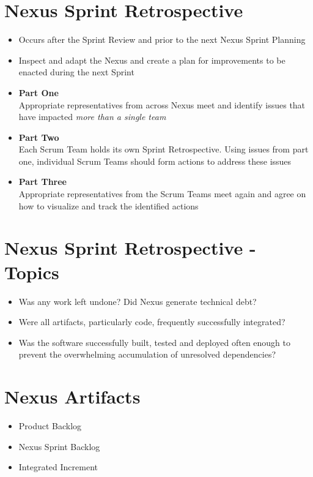 \documentclass[a4paper,11pt,twocolumn]{article}
\begin{document}
\section*{Nexus Sprint Retrospective}
\begin{itemize}
	\item Occurs after the Sprint Review and prior to the next Nexus Sprint Planning
	\item Inspect and adapt the Nexus and create a plan for improvements to be enacted during the next Sprint
	\item \textbf{Part One}\\
	Appropriate representatives from across Nexus meet and identify issues that have impacted \textit{more than a single team}
	\item \textbf{Part Two}\\
	Each Scrum Team holds its own Sprint Retrospective. Using issues from part one, individual Scrum Teams should form actions to address these issues
	\item \textbf{Part Three}\\
	Appropriate representatives from the Scrum Teams meet again and agree on how to visualize and track the identified actions
\end{itemize}

\section*{Nexus Sprint Retrospective - Topics}
\begin{itemize}
	\item Was any work left undone? Did Nexus generate technical debt?
	\item Were all artifacts, particularly code, frequently successfully integrated?
	\item Was the software successfully built, tested and deployed often enough to prevent the overwhelming accumulation of unresolved dependencies?
\end{itemize}

\section*{Nexus Artifacts}
\begin{itemize}
	\item Product Backlog
	\item Nexus Sprint Backlog
	\item Integrated Increment
\end{itemize}
\end{document}

